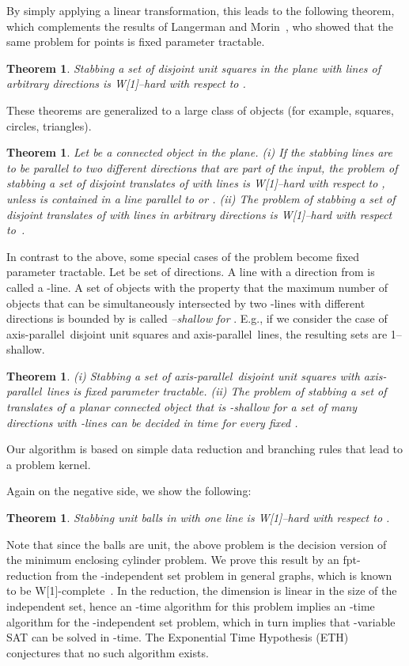 \documentclass[12pt]{article}
\newtheorem{theorem}[definition]{Theorem}
\newcommand{\cclass}[1]{{#1}}
\newcommand{\wone}{\cclass{W[1]}}
\newcommand{\ap}{a.p.\ }
\renewcommand{\ap}{axis-parallel\ }
\newcommand{\wrt}{w.r.t.\ }
\renewcommand{\wrt}{with respect to\ }
\begin{document}
By simply applying a linear transformation, this leads to the following theorem, 
which complements the results of Langerman and Morin~\cite{DBLP:journals/dcg/LangermanM05}, 
who showed that the same problem for points is fixed parameter tractable.

\begin{theorem}\label{thm:woneharddisjointunitsquares}
Stabbing a set of disjoint unit squares in the plane with  lines of arbitrary directions is \wone--hard with respect to .
\end{theorem}

These theorems are generalized to a large class of objects (for example, squares, circles,
triangles).

\begin{theorem}\label{thm:woneharddisjoint} Let  be a connected object in the plane. (i) If the stabbing lines are to be parallel to two different directions  that are part of the input, the problem of stabbing a set of disjoint translates of  with  lines is \wone--hard with respect to , unless  is contained in a line parallel to  or . (ii) The problem of stabbing a set of disjoint translates of  with  lines in arbitrary directions is \wone--hard \wrt .
\end{theorem}


In contrast to the above, some special cases of the problem become fixed parameter tractable.
Let  be set of directions.
A line with a direction from  is called a -line.
A set of objects with the property that the maximum number of
objects that can be simultaneously intersected by two -lines
with different directions is bounded by  is called
\emph{--shallow for }. E.g., if we consider the case of \ap disjoint unit squares and \ap lines, the resulting sets are 1--shallow.

\begin{theorem}\label{thm:fpt} 
  (i) Stabbing a set of  \ap disjoint unit squares with  \ap lines is fixed parameter tractable. (ii) The problem of stabbing a set of  translates of a planar connected
  object  that is -shallow for a set  of  many
  directions with  -lines can be decided in 
  time for every fixed .
\end{theorem}
Our algorithm is based on simple data reduction and branching rules that lead to a problem kernel.

Again on the negative side, we show the following:
\begin{theorem}\label{thm:balls}
Stabbing  unit balls in  with one line is 
W[1]--hard with respect to .
\end{theorem}
Note that since the balls are unit, the above problem is the decision version of the minimum enclosing cylinder problem.
We prove this result by an fpt-reduction from the -independent set problem in
general graphs, which is known to be W[1]-complete~\cite{FG06}.
In the reduction, the dimension  is linear in the size  of the independent set, hence
an -time algorithm for this problem implies an -time algorithm for the -independent set   
problem, which in turn implies that -variable SAT can be solved in -time. 
The Exponential Time Hypothesis (ETH)~\cite{DBLP:journals/jcss/ImpagliazzoP01} conjectures that no such algorithm exists.
\end{document}
